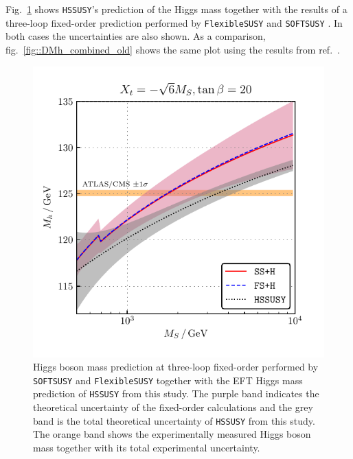 \documentclass[a4paper,12pt]{book}
\begin{document}
Fig.\ \ref{fig::DMh_combined} shows \texttt{HSSUSY}'s prediction of the Higgs mass together with the results of a three-loop fixed-order prediction performed by \texttt{FlexibleSUSY} and \texttt{SOFTSUSY} \cite{softsusy}. In both cases the uncertainties are also shown. As a comparison, fig.\ \ref{fig::DMh_combined_old} shows the same plot using the results from ref.\ \cite{allanachvoigt}.
\begin{figure}[!h]
\begin{minipage}[t]{0.5\textwidth}
\captionsetup{width=.8\textwidth}
\includegraphics[width=\textwidth]{src/img/DMh_MS_combined.pdf}
\caption{Higgs boson mass prediction at three-loop fixed-order performed by \texttt{SOFTSUSY} and \texttt{FlexibleSUSY} together with the EFT Higgs mass prediction of \texttt{HSSUSY} from this study. The purple band indicates the theoretical uncertainty of the fixed-order calculations and the grey band is the total theoretical uncertainty of \texttt{HSSUSY} from this study. The orange band shows the experimentally measured Higgs boson mass together with its total experimental uncertainty.}
\label{fig::DMh_combined}
\end{minipage}
\begin{minipage}[t]{0.5\textwidth}
\captionsetup{width=.8\textwidth}

\end{minipage}
\end{figure}
\end{document}
